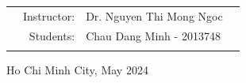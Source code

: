 \documentclass[a4paper]{report}
\begin{document}
\begin{titlepage}
  \begin{table}[h]
    \begin{tabular}{rrll}

      \hspace{5 cm}
       & Instructor: & Dr. Nguyen Thi Mong Ngoc \\
       & Students:   & Chau Dang Minh - 2013748 \\
       &             &
    \end{tabular}
  \end{table}
  \vspace{2cm}
  \begin{center}
    {\footnotesize Ho Chi Minh City, May 2024}
  \end{center}
\end{titlepage}



\tableofcontents










\printindex
\end{document}
